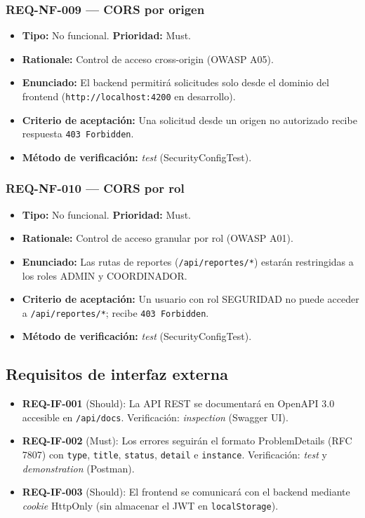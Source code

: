 \documentclass[12pt,a4paper]{article}
\begin{document}
\subsubsection{REQ-NF-009 — CORS por origen}
\begin{itemize}
  \item \textbf{Tipo:} No funcional. \textbf{Prioridad:} Must.
  \item \textbf{Rationale:} Control de acceso cross-origin (OWASP A05).
  \item \textbf{Enunciado:} El backend permitirá solicitudes solo desde el dominio del frontend
  (\texttt{http://localhost:4200} en desarrollo).
  \item \textbf{Criterio de aceptación:} Una solicitud desde un origen no autorizado recibe
  respuesta \texttt{403 Forbidden}.
  \item \textbf{Método de verificación:} \textit{test} (SecurityConfigTest).
\end{itemize}

\subsubsection{REQ-NF-010 — CORS por rol}
\begin{itemize}
  \item \textbf{Tipo:} No funcional. \textbf{Prioridad:} Must.
  \item \textbf{Rationale:} Control de acceso granular por rol (OWASP A01).
  \item \textbf{Enunciado:} Las rutas de reportes (\texttt{/api/reportes/*}) estarán restringidas
  a los roles ADMIN y COORDINADOR.
  \item \textbf{Criterio de aceptación:} Un usuario con rol SEGURIDAD no puede acceder a
  \texttt{/api/reportes/*}; recibe \texttt{403 Forbidden}.
  \item \textbf{Método de verificación:} \textit{test} (SecurityConfigTest).
\end{itemize}

\subsection{Requisitos de interfaz externa}
\label{sec:interfaz}

\begin{itemize}
  \item \textbf{REQ-IF-001} (Should): La API REST se documentará en OpenAPI 3.0 accesible en
  \texttt{/api/docs}. Verificación: \textit{inspection} (Swagger UI).
  \item \textbf{REQ-IF-002} (Must): Los errores seguirán el formato ProblemDetails (RFC 7807)
  con \texttt{type}, \texttt{title}, \texttt{status}, \texttt{detail} e \texttt{instance}.
  Verificación: \textit{test} y \textit{demonstration} (Postman).
  \item \textbf{REQ-IF-003} (Should): El frontend se comunicará con el backend mediante
  \textit{cookie} HttpOnly (sin almacenar el JWT en \texttt{localStorage}).
\end{itemize}
\end{document}
